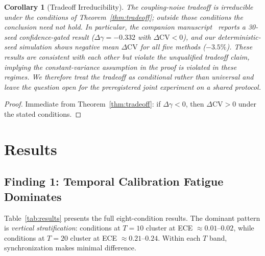 \documentclass[11pt]{article}
\newcommand{\CV}{\ensuremath{\mathrm{CV}}}
\newtheorem{corollary}[theorem]{Corollary}
\theoremstyle{definition}
\theoremstyle{remark}
\begin{document}
\begin{corollary}[Tradeoff Irreducibility]
The coupling-noise tradeoff is irreducible under the conditions of Theorem~\ref{thm:tradeoff}; outside those conditions the conclusion need not hold. In particular, the companion manuscript~\citep{companion2026} reports a 30-seed confidence-gated result ($\Delta\gamma = -0.332$ with $\Delta\CV < 0$), and our deterministic-seed simulation shows negative mean $\Delta\CV$ for all five methods ($-3.5\%$). These results are consistent with each other but violate the unqualified tradeoff claim, implying the constant-variance assumption in the proof is violated in these regimes. We therefore treat the tradeoff as conditional rather than universal and leave the question open for the preregistered joint experiment on a shared protocol.
\end{corollary}

\begin{proof}
Immediate from Theorem~\ref{thm:tradeoff}: if $\Delta\gamma < 0$, then $\Delta\CV > 0$ under the stated conditions.
\end{proof}

\section{Results}

\subsection{Finding 1: Temporal Calibration Fatigue Dominates}

Table~\ref{tab:results} presents the full eight-condition results. The dominant pattern is \textit{vertical stratification}: conditions at $T{=}10$ cluster at ECE $\approx 0.01$--$0.02$, while conditions at $T{=}20$ cluster at ECE $\approx 0.21$--$0.24$. Within each $T$ band, synchronization makes minimal difference.
\end{document}
